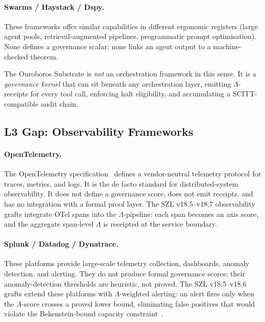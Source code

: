 \paragraph{Swarms / Haystack / Dspy.}
These frameworks offer similar capabilities in different ergonomic
registers (large agent pools, retrieval-augmented pipelines,
programmatic prompt optimisation).
None defines a governance scalar; none links an agent output to a
machine-checked theorem.

\medskip

The Ouroboros Substrate is \emph{not} an orchestration framework in this
sense.
It is a \emph{governance kernel} that can sit beneath any orchestration
layer, emitting \(\Lambda\)-receipts for every tool call, enforcing
halt eligibility, and accumulating a SCITT-compatible audit chain.

\subsection{L3 Gap: Observability Frameworks}
\label{ssec:l3gap}

\paragraph{OpenTelemetry.}
The OpenTelemetry specification~\cite{otel2023spec} defines a vendor-neutral
telemetry protocol for traces, metrics, and logs.
It is the de facto standard for distributed-system observability.
It does not define a governance score, does not emit receipts, and has no
integration with a formal proof layer.
The SZL v18.5--v18.7 observability grafts integrate OTel spans into the
\(\Lambda\)-pipeline: each span becomes an axis score, and the
aggregate span-level \(\Lambda\) is receipted at the service boundary.

\paragraph{Splunk / Datadog / Dynatrace.}
These platforms provide large-scale telemetry collection, dashboards,
anomaly detection, and alerting.
They do not produce formal governance scores; their anomaly-detection
thresholds are heuristic, not proved.
The SZL v18.5--v18.6 grafts extend these platforms with
\(\Lambda\)-weighted alerting: an alert fires only when the \(\Lambda\)-score
crosses a proved lower bound, eliminating false positives that would
violate the Bekenstein-bound capacity constraint~\cite{bekenstein1981universal}.

